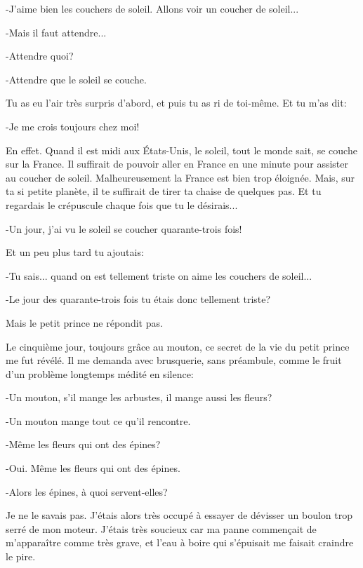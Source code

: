 \documentclass{report}
\begin{document}
-J'aime bien les couchers de soleil. Allons voir un coucher de soleil...

-Mais il faut attendre...

-Attendre quoi?

-Attendre que le soleil se couche.

Tu as eu l'air très surpris d'abord, et puis tu as ri de toi-même. Et tu m'as dit:

-Je me crois toujours chez moi!

En effet. Quand il est midi aux États-Unis, le soleil, tout le monde sait, se couche sur la France. Il suffirait de pouvoir aller en France en une minute pour assister au coucher de soleil. Malheureusement la France est bien trop éloignée. Mais, sur ta si petite planète, il te suffirait de tirer ta chaise de quelques pas. Et tu regardais le crépuscule chaque fois que tu le désirais...

-Un jour, j'ai vu le soleil se coucher quarante-trois fois!

Et un peu plus tard tu ajoutais:

-Tu sais... quand on est tellement triste on aime les couchers de soleil...

-Le jour des quarante-trois fois tu étais donc tellement triste?

Mais le petit prince ne répondit pas. 


\parachapter[VII]{} %
Le cinquième jour, toujours grâce au mouton, ce secret de la vie du petit prince me fut révélé. Il me demanda avec brusquerie, sans préambule, comme le fruit d'un problème longtemps médité en silence:

-Un mouton, s'il mange les arbustes, il mange aussi les fleurs?

-Un mouton mange tout ce qu'il rencontre.

-Même les fleurs qui ont des épines?

-Oui. Même les fleurs qui ont des épines.

-Alors les épines, à quoi servent-elles?

Je ne le savais pas. J'étais alors très occupé à essayer de dévisser un boulon trop serré de mon moteur. J'étais très soucieux car ma panne commençait de m'apparaître comme très grave, et l'eau à boire qui s'épuisait me faisait craindre le pire.
\end{document}
